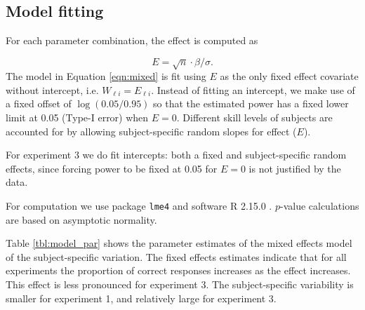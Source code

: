\documentclass[12pt]{article}
\newcommand{\green}[1]{{\color{green} #1}} %
\begin{document}
\subsection{Model fitting}
 For each parameter combination, the effect is computed as 

\[
E=\sqrt {n} \cdot \beta/\sigma.
\]
\noindent
The model in Equation \ref{eqn:mixed} is fit using $E$ as the only fixed effect covariate without intercept, i.e. 
 $W_{\ell i} = E_{\ell i}$. Instead of fitting an intercept, we make use of a fixed  offset of $\log(0.05/0.95)$ so that the estimated power has a fixed lower limit at 0.05 (Type-I error) when $E=0$. Different skill levels of subjects are accounted for  by allowing subject-specific random  slopes for  effect ($E$). 

For experiment 3 we do fit intercepts: both a fixed  and subject-specific random effects, since forcing power
to be fixed at 0.05 for $E=0$ is not justified by the data. %


For computation we use package {\tt lme4} \citep{lme4:2011} and software R 2.15.0 \citep{R}. $p$-value calculations are based on asymptotic normality.

Table \ref{tbl:model_par} shows the parameter estimates of the mixed effects model of the subject-specific variation. The fixed effects estimates indicate that for all experiments  the proportion of correct responses increases as the effect increases. This effect is less pronounced  for experiment 3. The subject-specific variability is smaller for experiment 1, and relatively large for experiment 3. %
\end{document}
